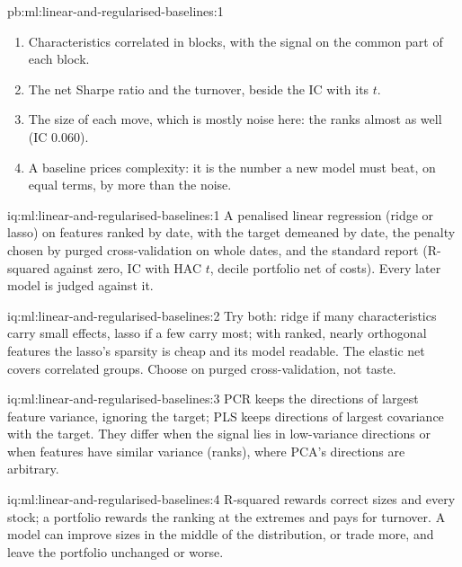 \begin{solution}{pb:ml:linear-and-regularised-baselines:1}
\begin{enumerate}
over 4\,000 months; no feasible track separates them.
\item Characteristics correlated in blocks, with the signal on the common part of each block.
\item The net Sharpe ratio and the turnover, beside the IC with its $t$.
\item The size of each move, which is mostly noise here: the  ranks almost as well (IC 0.060).
\item A baseline prices complexity: it is the number a new model must beat, on equal terms, by more than the noise.
\end{enumerate}
\end{solution}

\begin{solution}{iq:ml:linear-and-regularised-baselines:1}
A penalised linear regression (ridge or lasso) on features ranked by date, with the target demeaned by date, the penalty
chosen by purged cross-validation on whole dates, and the standard report (R-squared against zero, IC with HAC $t$,
decile portfolio net of costs). Every later model is judged against it.
\end{solution}

\begin{solution}{iq:ml:linear-and-regularised-baselines:2}
Try both: ridge if many characteristics carry small effects, lasso if a few carry most; with ranked, nearly orthogonal
features the lasso's sparsity is cheap and its model readable. The elastic net covers correlated groups. Choose on
purged cross-validation, not taste.
\end{solution}

\begin{solution}{iq:ml:linear-and-regularised-baselines:3}
PCR keeps the directions of largest feature variance, ignoring the target; PLS keeps directions of largest covariance with
the target. They differ when the signal lies in low-variance directions or when features have similar variance (ranks),
where PCA's directions are arbitrary.
\end{solution}

\begin{solution}{iq:ml:linear-and-regularised-baselines:4}
R-squared rewards correct sizes and every stock; a portfolio rewards the ranking at the extremes and pays for turnover.
A model can improve sizes in the middle of the distribution, or trade more, and leave the portfolio unchanged or worse.
\end{solution}

